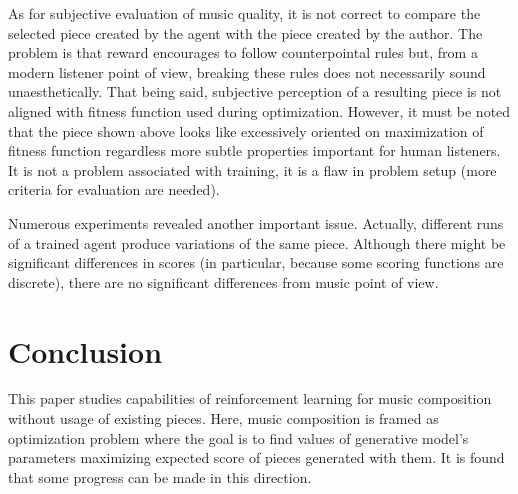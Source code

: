 \documentclass{article}
\begin{document}
As for subjective evaluation of music quality, it is not correct to compare the selected piece created by the agent with the piece created by the author. The problem is that reward encourages to follow counterpointal rules but, from a modern listener point of view, breaking these rules does not necessarily sound unaesthetically. That being said, subjective perception of a resulting piece is not aligned with fitness function used during optimization. However, it must be noted that the piece shown above looks like excessively oriented on maximization of fitness function regardless more subtle properties important for human listeners. It is not a problem associated with training, it is a flaw in problem setup (more criteria for evaluation are needed).

Numerous experiments revealed another important issue. Actually, different runs of a trained agent produce variations of the same piece. Although there might be significant differences in scores (in particular, because some scoring functions are discrete), there are no significant differences from music point of view.


\section{Conclusion}
\label{sec:conclusion}

This paper studies capabilities of reinforcement learning for music composition without usage of existing pieces. Here, music composition is framed as optimization problem where the goal is to find values of generative model's parameters maximizing expected score of pieces generated with them. It is found that some progress can be made in this direction.
\end{document}
